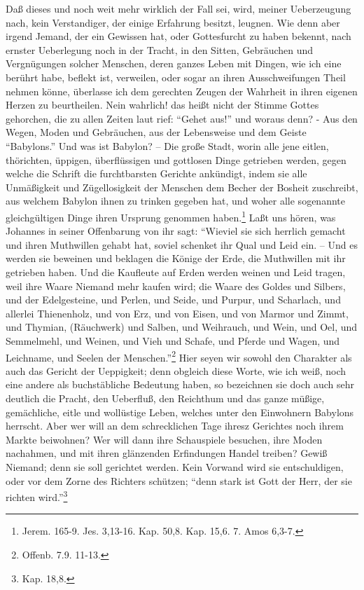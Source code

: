 Daß dieses und noch weit mehr wirklich der Fall sei, wird, meiner Ueberzeugung
nach, kein Verstandiger, der einige Erfahrung besitzt, leugnen. Wie denn aber
irgend Jemand, der ein Gewissen hat, oder Gottesfurcht zu haben bekennt, nach
ernster Ueberlegung noch in der Tracht, in den Sitten, Gebräuchen und
Vergnügungen solcher Menschen, deren ganzes Leben mit Dingen, wie ich eine
berührt habe, beflekt ist, verweilen, oder sogar an ihren Ausschweifungen Theil
nehmen könne, überlasse ich dem gerechten Zeugen der Wahrheit in ihren eigenen
Herzen zu beurtheilen. Nein wahrlich! das heißt nicht der Stimme Gottes
gehorchen,  die zu allen Zeiten laut rief: "`Gehet aus!"' und woraus denn? - Aus
den Wegen, Moden und Gebräuchen, aus der Lebensweise und dem Geiste
"`Babylons."' Und was ist Babylon? -- Die große Stadt, worin alle jene eitlen,
thörichten, üppigen, überflüssigen und gottlosen Dinge getrieben werden, gegen
welche die Schrift die furchtbarsten Gerichte ankündigt, indem sie alle
Unmäßigkeit und Zügellosigkeit der Menschen dem Becher der Bosheit zuschreibt,
aus welchem Babylon ihnen zu trinken gegeben hat, und woher alle sogenannte
gleichgültigen Dinge ihren Ursprung genommen haben.\footnote{Jerem. 165-9. Jes.
3,13-16. Kap. 50,8. Kap. 15,6. 7. Amos 6,3-7.} Laßt uns hören, was Johannes in
seiner Offenbarung von ihr sagt: "`Wieviel sie sich herrlich gemacht und ihren
Muthwillen gehabt hat, soviel schenket ihr Qual und Leid ein. -- Und es werden
sie beweinen und beklagen die Könige der Erde, die Muthwillen mit ihr getrieben
haben. Und die Kaufleute auf Erden werden weinen und Leid tragen, weil ihre
Waare Niemand mehr kaufen wird; die Waare des Goldes und Silbers, und der
Edelgesteine, und Perlen, und Seide, und Purpur, und Scharlach, und allerlei
Thienenholz, und von Erz, und von Eisen, und von Marmor und Zimmt, und Thymian,
(Räuchwerk) und Salben, und Weihrauch, und Wein, und Oel, und Semmelmehl, und
Weinen, und Vieh und Schafe, und Pferde und Wagen, und Leichname, und Seelen der
Menschen."'\footnote{Offenb. 7.9. 11-13.} Hier seyen wir sowohl den Charakter
als auch das Gericht der Ueppigkeit; denn obgleich diese Worte, wie ich weiß,
noch eine andere als buchstäbliche Bedeutung haben, so bezeichnen sie doch auch
sehr deutlich die Pracht, den Ueberfluß, den Reichthum und das ganze müßige,
gemächliche, eitle und wollüstige Leben, welches unter den Einwohnern Babylons
herrscht. Aber wer will an dem schrecklichen Tage ihresz Gerichtes noch ihrem
Markte beiwohnen? Wer will dann ihre Schauspiele besuchen, ihre Moden nachahmen,
und mit ihren glänzenden Erfindungen Handel treiben? Gewiß Niemand; denn sie
soll gerichtet werden. Kein Vorwand wird sie entschuldigen, oder vor dem Zorne
des Richters schützen; "`denn stark ist Gott der Herr, der sie richten
wird."'\footnote{Kap. 18,8.}

